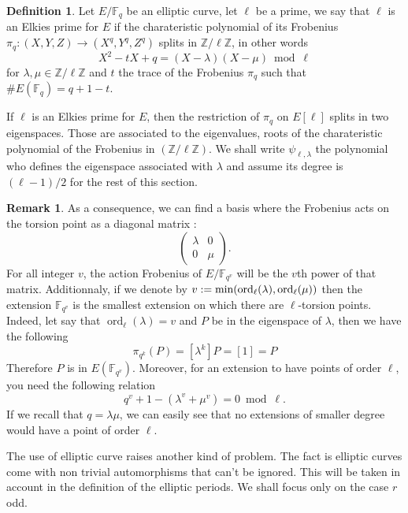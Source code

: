 \documentclass[12pt]{article}
\theoremstyle{plain}
\theoremstyle{definition}
\newtheorem{definition}[theorem]{Definition}
\newtheorem*{remark}{Remark}
\DeclareMathOperator{\order}{ord} %
\def\Z{\ensuremath{\mathbb{Z}}}
\def\F{\ensuremath{\mathbb{F}}}
\begin{document}
\begin{definition}
Let $E/\F_q$ be an elliptic curve, let $\ell$ be a prime, we say that $\ell$
is an Elkies prime for $E$ if the charateristic polynomial of its Frobenius
$\pi_q : (X, Y, Z) \to (X^q, Y^q, Z^q)$ splits in $\Z/\ell\Z$, in other words
\begin{equation}
X^2-tX+q=(X-\lambda)(X-\mu)\bmod\ell
\end{equation}
for $\lambda,\mu\in\Z/\ell\Z$ and $t$ the trace of the Frobenius $\pi_q$ such that 
$\#E(\F_q)=q+1-t$.
\end{definition}

If $\ell$ is an Elkies prime for $E$, then the restriction of $\pi_q$ on
$E[\ell]$ splits in two eigenspaces. Those are associated to the eigenvalues,
roots of the charateristic polynomial of the Frobenius in $(\Z/\ell\Z)$. 
We shall write $\psi_{\ell,\lambda}$ the polynomial who defines the eigenspace 
associated with $\lambda$ and assume its degree is $(\ell - 1)/2$ for the rest
of this section. 

\begin{remark}
As a consequence, we can find a basis where the Frobenius acts on the torsion 
point as a diagonal matrix :
\begin{equation}
\begin{pmatrix}
\lambda & 0\\
0 & \mu
\end{pmatrix}.
\end{equation}
For all integer $v$, the action Frobenius of $E/\F_{q^v}$ will be the $v$th
power of that matrix. Additionnaly, if we denote by $v :=
\textup{min}(\order_\ell(\lambda),\order_\ell(\mu))$ then the extension $\F_{q^v}$ is
the smallest extension on which there are $\ell$-torsion points. Indeed, let 
say that $\order_\ell(\lambda) = v$ and $P$ be in the eigenspace of $\lambda$, 
then we have the following
\begin{equation}
\pi_{q^k}(P)=[\lambda^k]P=[1]=P
\end{equation}
Therefore $P$ is in $E(\F_{q^v})$. Moreover, for an extension to have points of
order $\ell$, you need the following relation
\begin{equation}
q^v + 1 - (\lambda^v + \mu^v) = 0 \bmod \ell.
\end{equation}
If we recall that $q=\lambda\mu$, we can easily see that no extensions of
smaller degree would have a point of order $\ell$.
\end{remark}
\hspace{0.3cm}
The use of elliptic curve raises another kind of problem. The fact is elliptic 
curves come with non trivial automorphisms that can't be ignored. This will be 
taken in account in the definition of the elliptic periods. We shall focus
only on the case $r$ odd.
\end{document}
